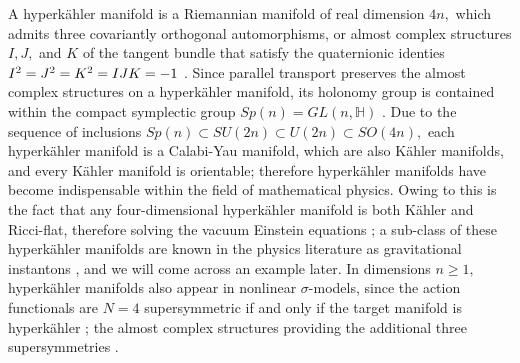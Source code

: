\documentclass[a4paper,12pt, onecolumn, notitlepage]{article}
\theoremstyle{definition}
\theoremstyle{remark}
\newcommand{\K}{K\"ahler }
\newcommand{\HK}{hyperk\"ahler }
\begin{document}
A \HK manifold is a Riemannian manifold of real dimension $4n,$ which admits three covariantly orthogonal automorphisms, or almost complex structures $I,J,$ and $K$ of the tangent bundle that satisfy the quaternionic identies $I\indices{^2}=J\indices{^2}=K\indices{^2}=IJK=-1$ \cite{hitchin_1991}. Since parallel transport preserves the almost complex structures on a \HK manifold, its holonomy group is contained within the compact symplectic group $Sp(n) = GL(n,\mathbb{H})$ \cite{berger_1955}. Due to the sequence of inclusions $Sp(n)\subset SU(2n)\subset U(2n) \subset SO(4n),$ each \HK manifold is a Calabi-Yau manifold, which are also \K manifolds, and every \K manifold is orientable; therefore \HK manifolds have become indispensable within the field of mathematical physics. Owing to this is the fact that any four-dimensional \HK manifold is both \K and Ricci-flat, therefore solving the vacuum Einstein equations \cite{hitchin_1991}; a sub-class of these \HK manifolds are known in the physics literature as gravitational instantons \cite{dancer_1994, eguchi_1978, gibbons_1978}, and we will come across an example later. 
In dimensions $n\geq1,$ \HK manifolds also appear in nonlinear $\sigma$-models, since the action functionals are $N=4$ supersymmetric if and only if the target manifold is \HK; the almost complex structures providing the additional three supersymmetries \cite{hitchin_1987}.
\end{document}
